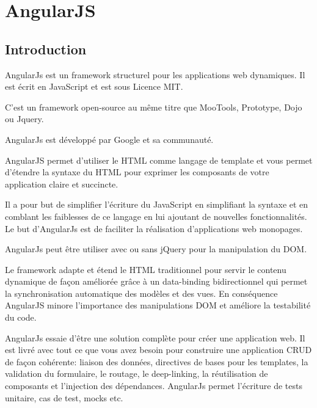 \section{AngularJS}
\label{ch:angularjs}

\subsection{Introduction}

AngularJs est un framework structurel pour les applications web dynamiques. Il est écrit en  JavaScript et est sous Licence MIT.

C’est un framework open-source au même titre que MooTools, Prototype, Dojo ou Jquery.

AngularJs est développé par Google et sa communauté.

AngularJS permet d’utiliser le HTML comme langage de template et vous permet d’étendre la syntaxe du HTML pour exprimer les composants de votre application claire et succincte.

Il a pour but de simplifier l’écriture du JavaScript en simplifiant la syntaxe et en comblant les faiblesses de ce langage en lui ajoutant de nouvelles fonctionnalités. Le but d’AngularJs est de faciliter la réalisation d’applications web monopages.

AngularJs peut être utiliser avec ou sans jQuery pour la manipulation du DOM.

Le framework adapte et étend le HTML traditionnel pour servir le contenu dynamique de façon améliorée grâce à un data-binding bidirectionnel qui permet la synchronisation automatique des modèles et des vues. En conséquence AngularJS minore l’importance des manipulations DOM et améliore la testabilité du code.

AngularJs essaie d’être une solution complète pour créer une application web. Il est livré avec tout ce que vous avez besoin pour construire une application CRUD de façon cohérente: liaison des données, directives de bases pour les templates, la validation du formulaire, le routage, le deep-linking, la réutilisation de composants et l’injection des dépendances. AngularJs permet l’écriture de tests unitaire, cas de test, mocks etc.



